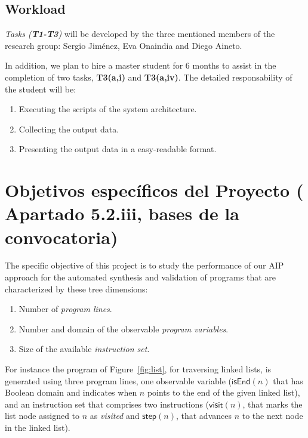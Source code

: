 \documentclass[10pt,a4paper]{paper}
\begin{document}
\subsection{Workload}

{\em Tasks ({\bf T1-T3})} will be developed by the three mentioned members of the research group: Sergio Jiménez, Eva Onaindia and Diego Aineto.

In addition, we plan to hire a master student for 6 months to assist in the completion of two tasks, {\bf T3(a,i)} and {\bf T3(a,iv)}. The detailed responsability of the student will be:
\begin{enumerate}
\item Executing the scripts of the system architecture.
\item Collecting the output data.
\item Presenting the output data in a easy-readable format.
\end{enumerate}

\newpage
\section{Objetivos específicos del Proyecto ( Apartado 5.2.iii, bases de la convocatoria)}
\label{subsec:objectivos}

The specific objective of this project is to study the performance of our AIP approach for the automated synthesis and validation of programs that are characterized by these tree dimensions:
\begin{enumerate}
\item Number of {\em program lines}.
\item Number and domain of the observable {\em program variables}.
\item Size of the available {\em instruction set}.
\end{enumerate}  

For instance the program of Figure~\ref{fig:list}, for traversing linked lists, is generated using three program lines, one observable variable ($\mathsf{isEnd}(n)$ that has Boolean domain and indicates when $n$ points to the end of the given linked list), and an instruction set that comprises two instructions ($\mathsf{visit}(n)$, that marks the list node assigned to $n$ as {\em visited} and $\mathsf{step}(n)$, that advances $n$ to the next node in the linked list).
\end{document}

